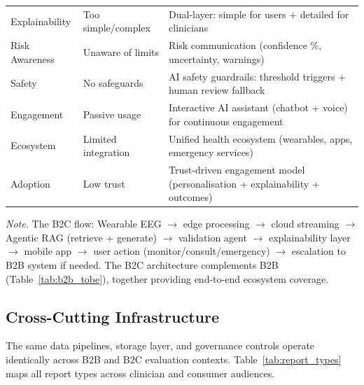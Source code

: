 {\begin{xltabular}{\textwidth}{@{} >{\raggedright\arraybackslash}p{3.0cm} >{\raggedright\arraybackslash}p{3.2cm} L @{}}
\addlinespace
Explainability & Too simple/complex & Dual-layer: simple for users + detailed for clinicians \\
\addlinespace
Risk Awareness & Unaware of limits & Risk communication (confidence \%, uncertainty, warnings) \\
\addlinespace
Safety & No safeguards & AI safety guardrails: threshold triggers + human review fallback \\
\addlinespace
Engagement & Passive usage & Interactive AI assistant (chatbot + voice) for continuous engagement \\
\addlinespace
Ecosystem & Limited integration & Unified health ecosystem (wearables, apps, emergency services) \\
\addlinespace
Adoption & Low trust & Trust-driven engagement model (personalisation + explainability + outcomes) \\
\end{xltabular}}
\vspace{0.5em}
\noindent\textit{Note.} The B2C flow: Wearable EEG $\to$ edge processing $\to$ cloud streaming $\to$ Agentic RAG (retrieve + generate) $\to$ validation agent $\to$ explainability layer $\to$ mobile app $\to$ user action (monitor/consult/emergency) $\to$ escalation to B2B system if needed. The B2C architecture complements B2B (Table~\ref{tab:b2b_tobe}), together providing end-to-end ecosystem coverage.
\fi %

\label{sec:b2c_tobe}
\label{tab:b2c_tobe}

\subsection{Cross-Cutting Infrastructure}
\label{sec:cross_cutting_infrastructure}
\label{sec:report_generation}

\iffalse %
The same data pipelines, storage layer, and governance controls operate identically across B2B and B2C evaluation contexts. Table~\ref{tab:report_types} maps all report types across clinician and consumer audiences.


